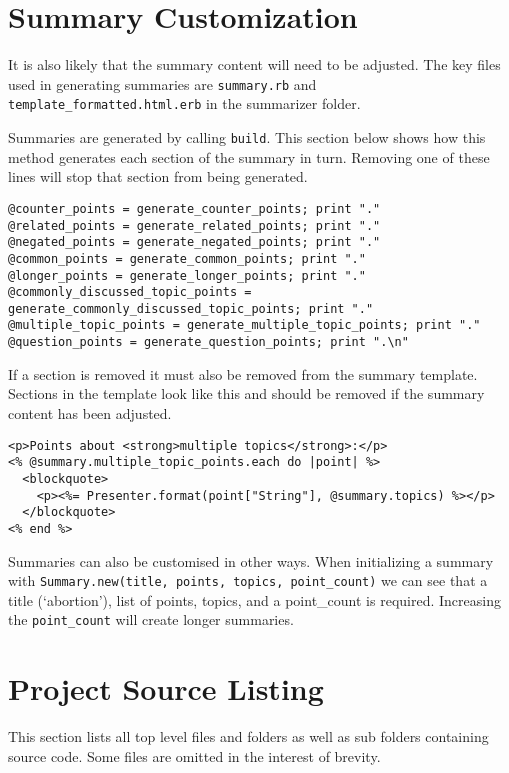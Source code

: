 \section{Summary Customization}

It is also likely that the summary content will need to be adjusted. The
key files used in generating summaries are \texttt{summary.rb} and
\texttt{template\_formatted.html.erb} in the summarizer folder.

Summaries are generated by calling \texttt{build}. This section below
shows how this method generates each section of the summary in turn.
Removing one of these lines will stop that section from being generated.

\begin{verbatim}
@counter_points = generate_counter_points; print "."
@related_points = generate_related_points; print "."
@negated_points = generate_negated_points; print "."
@common_points = generate_common_points; print "."
@longer_points = generate_longer_points; print "."
@commonly_discussed_topic_points = generate_commonly_discussed_topic_points; print "."
@multiple_topic_points = generate_multiple_topic_points; print "."
@question_points = generate_question_points; print ".\n"
\end{verbatim}

If a section is removed it must also be removed from the summary
template. Sections in the template look like this and should be removed
if the summary content has been adjusted.

\begin{verbatim}
<p>Points about <strong>multiple topics</strong>:</p>
<% @summary.multiple_topic_points.each do |point| %>
  <blockquote>
    <p><%= Presenter.format(point["String"], @summary.topics) %></p>
  </blockquote>
<% end %>
\end{verbatim}

Summaries can also be customised in other ways. When initializing a
summary with
\texttt{Summary.new(title,\ points,\ topics,\ point\_count)} we can see
that a title (`abortion'), list of points, topics, and a point\_count is
required. Increasing the \texttt{point\_count} will create longer
summaries.

\section{Project Source Listing}

This section lists all top level files and folders as well as sub folders containing source code. Some files are omitted in the interest of brevity.

